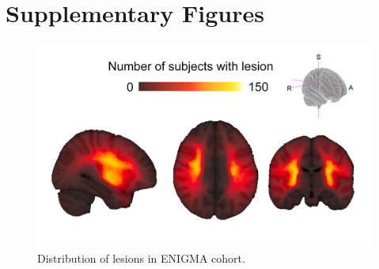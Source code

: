 \documentclass[10pt]{article}
\begin{document}
\beginsupplement
\section*{Supplementary Figures}

\begin{figure}[ht]
\centering
\includegraphics[width=0.8\linewidth]{figures/distribution_lesions.png}
\caption{Distribution of lesions in ENIGMA cohort.}
\label{lesiondist}
\end{figure}
\end{document}
